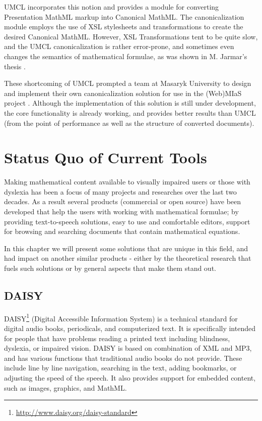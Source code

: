 \documentclass[11pt,oneside,final]{fithesis2}
\begin{document}
UMCL incorporates this notion and provides a module for converting Presentation MathML markup into Canonical MathML. The canonicalization module employs the use of XSL stylesheets and transformations to create the desired Canonical MathML. However, XSL Transformations tent to be quite slow, and the UMCL canonicalization is rather error-prone, and sometimes even changes the semantics of mathematical formulae, as was shown in M. Jarmar's thesis \cite[chapter 5]{umcl:jarmar2012conversion}. 

These shortcoming of UMCL prompted a team at Masaryk University to design and implement their own canonicalization solution \cite{canonicalization:formaneketal} for use in the (Web)MIaS project \cite{mias:sojka2011indexing}. Although the implementation of this solution is still under development, the core functionality is already working, and provides better results than UMCL (from the point of performance as well as the structure of converted documents). 

\chapter{Status Quo of Current Tools}
Making mathematical content available to visually impaired users or those with dyslexia has been a focus of many projects and researches over the last two decades. As a result several products (commercial or open source) have been developed that help the users with working with mathematical formulae; by providing text-to-speech solutions, easy to use and comfortable editors, support for browsing and searching documents that contain mathematical equations.

In this chapter we will present some solutions that are unique in this field, and had impact on another similar products - either by the theoretical research that fuels such solutions or by general aspects that make them stand out. 

\section{DAISY}
DAISY\footnote{\url{http://www.daisy.org/daisy-standard}} (Digital Accessible Information System) is a technical standard for digital audio books, periodicals, and computerized text. It is specifically intended for people that have problems reading a printed text including blindness, dyslexia, or impaired vision. DAISY is based on combination of XML and MP3, and has various functions that traditional audio books do not provide. These include line by line navigation, searching in the text, adding bookmarks, or adjusting the speed of the speech. It also provides support for embedded content, such as images, graphics, and MathML. 
\end{document}

